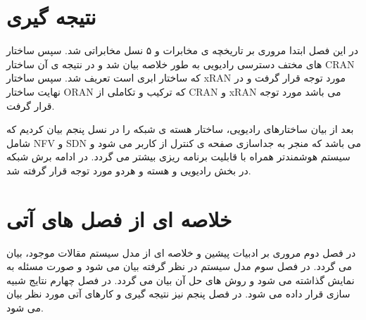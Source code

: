 \section{نتیجه گیری}
  در این فصل ابتدا مروری بر تاریخچه ی مخابرات و ۵ نسل مخابراتی شد. سپس ساختار های مختف دسترسی رادیویی به طور خلاصه بیان شد و در نتیجه ی آن ساختار CRAN که ساختار ابری است تعریف شد. سپس ساختار xRAN
  مورد توجه قرار گرفت و در نهایت ساختار ORAN 
  که ترکیب و تکاملی از CRAN و xRAN می باشد مورد توجه قرار گرفت.
  
 بعد از بیان ساختارهای رادیویی، ساختار هسته ی شبکه را در نسل پنجم بیان کردیم که شامل 
 NFV و SDN 
 می باشد که منجر به جداسازی صفحه ی کنترل از کاربر می شود و سیستم هوشمندتر همراه با قابلیت برنامه ریزی بیشتر می گردد.
 در ادامه برش شبکه در بخش رادیویی و هسته و هردو مورد توجه قرار گرفته شد.
\section{خلاصه ای از فصل های آتی}
در فصل دوم مروری بر ادبیات پیشین و خلاصه ای از مدل سیستم مقالات موجود، بیان می گردد.
در فصل سوم مدل سیستم در نظر گرفته بیان می شود و صورت مسئله به نمایش گذاشته می شود و روش های حل آن بیان می گردد.
در فصل چهارم نتایج شبیه سازی قرار داده می شود.
در فصل پنجم نیز نتیجه گیری و کارهای آتی مورد نظر بیان می شود.   
 